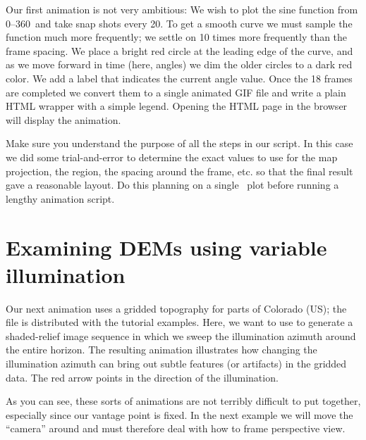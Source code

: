 Our first animation is not very ambitious: We wish to plot the sine
function from 0--360\DS\ and take snap shots every 20\DS.  To get a
smooth curve we must sample the function much more frequently; we
settle on 10 times more frequently than the frame spacing.  We place
a bright red circle at the leading edge of the curve, and as we move
forward in time (here, angles) we dim the older circles to a dark red
color.  We add a label that indicates the current angle value.  Once
the 18 frames are completed we convert them to a single animated GIF file
and write a plain HTML wrapper with a simple legend.  Opening the HTML
page  in the browser will display the animation.


Make sure you understand the purpose of all the steps in our script.
In this case we did some trial-and-error to determine the exact values
to use for the map projection, the region, the spacing around the frame,
etc. so that the final result gave a reasonable layout.  Do this planning
on a single \PS\ plot before running a lengthy animation script.



\section{Examining DEMs using variable illumination}

Our next animation uses a gridded topography for parts of Colorado (US);
the file is distributed with the tutorial examples.  Here, we want to
use  to generate a shaded-relief image sequence in
which we sweep the illumination azimuth around the entire horizon.  The
resulting animation illustrates how changing the illumination azimuth
can bring out subtle features (or artifacts) in the gridded data.  The
red arrow points in the direction of the illumination.


As you can see, these sorts of animations are not terribly difficult to
put together, especially since our vantage point is fixed.  In the next
example we will move the ``camera'' around and must therefore deal with
how to frame perspective view.


